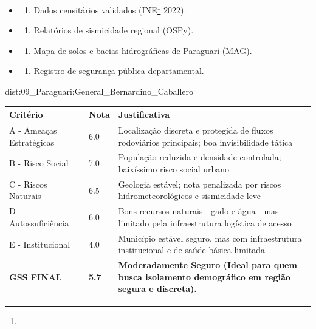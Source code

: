 {\begin{itemize}
\tightlist
\item
  \begin{enumerate}
  \def\labelenumi{\arabic{enumi})}
  \tightlist
  \item
    Dados censitários validados (INE\footnote{\fineINE} 2022).
  \end{enumerate}
\item
  \begin{enumerate}
  \def\labelenumi{\arabic{enumi})}
  \setcounter{enumi}{1}
  \tightlist
  \item
    Relatórios de sismicidade regional (OSPy).
  \end{enumerate}
\item
  \begin{enumerate}
  \def\labelenumi{\arabic{enumi})}
  \setcounter{enumi}{2}
  \tightlist
  \item
    Mapa de solos e bacias hidrográficas de Paraguarí (MAG).
  \end{enumerate}
\item
  \begin{enumerate}
  \def\labelenumi{\arabic{enumi})}
  \setcounter{enumi}{3}
  \tightlist
  \item
    Registro de segurança pública departamental.
  \end{enumerate}
\end{itemize}}{dist:09_Paraguari:General_Bernardino_Caballero}
\begin{table}[ht!]
\small \begin{tabular}{p{3.0cm}p{0.8cm}p{6.0cm}} \toprule
\textbf{Critério} & \textbf{Nota} & \textbf{Justificativa} \\ \midrule
A - Ameaças Estratégicas & 6.0 & Localização discreta e protegida de fluxos rodoviários principais; boa invisibilidade tática \\
B - Risco Social & 7.0 & População reduzida e densidade controlada; baixíssimo risco social urbano \\
C - Riscos Naturais & 6.5 & Geologia estável; nota penalizada por riscos hidrometeorológicos e sismicidade leve \\
D - Autossuficiência & 6.0 & Bons recursos naturais - gado e água - mas limitado pela infraestrutura logística de acesso \\
E - Institucional & 4.0 & Município estável seguro, mas com infraestrutura institucional e de saúde básica limitada \\
\midrule \textbf{GSS FINAL} & \textbf{5.7} & \textbf{Moderadamente Seguro (Ideal para quem busca isolamento demográfico em região segura e discreta).} \\ \bottomrule \end{tabular}
\end{table}
